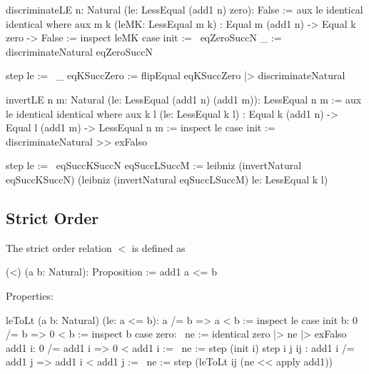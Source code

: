 \begin{alba}
    discriminateLE {n: Natural} (le: LessEqual (add1 n) zero): False :=
        aux
            le
            identical
            identical
        where
            aux
                {m k}
                (leMK: LessEqual m k)
                : Equal m (add1 n) -> Equal k zero -> False
            :=
                inspect leMK case
                    init :=
                        \ eqZeroSuccN _ :=
                            discriminateNatural eqZeroSuccN

                    step le :=
                        \ _ eqKSuccZero :=
                            flipEqual eqKSuccZero
                            |> discriminateNatural


    invertLE {n m: Natural} (le: LessEqual (add1 n) (add1 m)): LessEqual n m :=
        aux
            le
            identical
            identical
        where
            aux
                {k l}
                (le: LessEqual k l)
                : Equal k (add1 n) -> Equal l (add1 m) -> LessEqual n m
            :=
                inspect le case
                    init :=
                        discriminateNatural >> exFalso

                    step le :=
                        \ eqSuccKSuccN eqSuccLSuccM :=
                            leibniz
                                (invertNatural eqSuccKSuccN)
                                (leibniz
                                    (invertNatural eqSuccLSuccM)
                                    le: LessEqual k l)
\end{alba}













\vskip 5mm
\subsection{Strict Order}

\noindent The strict order relation $<$ is defined as

\begin{alba}
  (<) (a b: Natural): Proposition :=
    add1 a <= b
\end{alba}

Properties:

\begin{alba}
    leToLt (a b: Natural) (le: a <= b): a /= b => a < b :=
        inspect le case
            init b: 0 /= b => 0 < b :=
                inspect b case
                    zero: \ ne := identical zero |> ne |> exFalso
                    add1 i: 0 /= add1 i => 0 < add1 i :=
                        \ ne := step (init i)
            step i j ij
            : add1 i /= add1 j => add1 i < add1 j :=
                \ ne :=
                    step (leToLt ij (ne << apply add1))
\end{alba}


